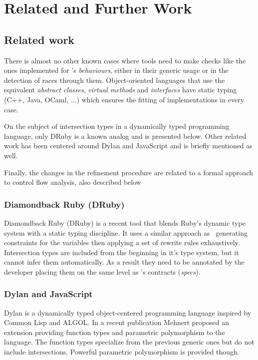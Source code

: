 \chapter{Related and Further Work}

\section{Related work}
\label{sct:related_work}

There is almost no other known cases where tools need to make checks
like the ones implemented for \er's \emph{behaviours}, either in their
generic usage or in the detection of races through
them. Object-oriented languages that use the equivalent \emph{abstract
  classes}, \emph{virtual methods} and \emph{interfaces} have static
typing (C++, Java, OCaml, ...) which ensures the fitting of
implementations in every case.

On the subject of intersection types in a dynamically typed
programming language, only DRuby is a known analog and is presented
below. Other related work has been centered around Dylan and
JavaScript and is briefly mentioned as well.

Finally, the changes in the refinement procedure are related to a
formal approach to control flow analysis, also described below

\subsection{Diamondback Ruby (DRuby)}

Diamondback Ruby (DRuby)\cite{druby} is a recent tool that blends
Ruby's dynamic type system with a static typing discipline. It uses a
similar approach as \dr\ generating constraints for the variables then
applying a set of rewrite rules exhaustively. Intersection types are
included from the beginning in it's type system, but it cannot infer
them automatically. As a result they need to be annotated by the
developer placing them on the same level as \dr's contracts
(\emph{specs}).

\subsection{Dylan and JavaScript}

Dylan is a dynamically typed object-centered programming language
inspired by Common Lisp and ALGOL. In a recent publication Mehnert
proposed an extension providing function types and parametric
polymorphism to the language\cite{dylan}. The function types
specialize from the previous generic ones but do not include
intersections. Powerful parametric polymorphism is provided though.

